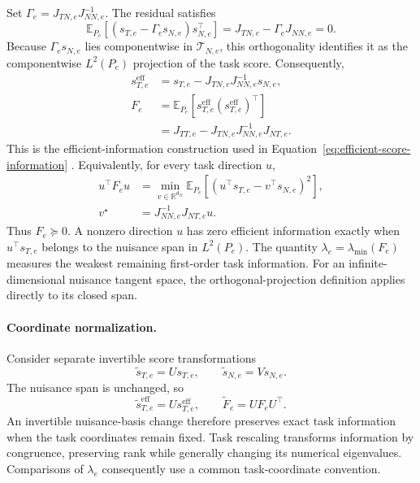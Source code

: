 Set \(\Gamma_e=J_{TN,e}J_{NN,e}^{-1}\). The residual satisfies
\[
\mathbb E_{P_e}\!\left[
(s_{T,e}-\Gamma_es_{N,e})s_{N,e}^{\top}
\right]
=
J_{TN,e}-\Gamma_eJ_{NN,e}
=
0.
\tag{A.1}\label{eq:app-score-orthogonality}
\]
Because \(\Gamma_es_{N,e}\) lies componentwise in \(\mathcal T_{N,e}\), this orthogonality identifies it as the componentwise \(L^2(P_e)\) projection of the task score. Consequently,
\[
\begin{aligned}
s_{T,e}^{\mathrm{eff}}
&=
s_{T,e}-J_{TN,e}J_{NN,e}^{-1}s_{N,e},
\\
F_e
&=
\mathbb E_{P_e}\!\left[
s_{T,e}^{\mathrm{eff}}
(s_{T,e}^{\mathrm{eff}})^{\top}
\right]
\\
&=
J_{TT,e}-J_{TN,e}J_{NN,e}^{-1}J_{NT,e}.
\end{aligned}
\tag{A.2}\label{eq:app-efficient-schur}
\]
This is the efficient-information construction used in Equation~\eqref{eq:efficient-score-information} \citep{bickel1993efficient,tsiatis2006semiparametric}. Equivalently, for every task direction \(u\),
\[
\begin{aligned}
u^{\top}F_eu
&=
\min_{v\in\mathbb R^{d_N}}
\mathbb E_{P_e}\!\left[
(u^{\top}s_{T,e}-v^{\top}s_{N,e})^2
\right],
\\
v^\star
&=
J_{NN,e}^{-1}J_{NT,e}u.
\end{aligned}
\tag{A.3}\label{eq:app-variational-schur}
\]
Thus \(F_e\succeq0\). A nonzero direction \(u\) has zero efficient information exactly when \(u^{\top}s_{T,e}\) belongs to the nuisance span in \(L^2(P_e)\). The quantity \(\lambda_e=\lambda_{\min}(F_e)\) measures the weakest remaining first-order task information. For an infinite-dimensional nuisance tangent space, the orthogonal-projection definition applies directly to its closed span.

\paragraph{Coordinate normalization.}

Consider separate invertible score transformations
\[
\widetilde s_{T,e}=Us_{T,e},
\qquad
\widetilde s_{N,e}=Vs_{N,e}.
\]
The nuisance span is unchanged, so
\[
\widetilde s_{T,e}^{\mathrm{eff}}
=
Us_{T,e}^{\mathrm{eff}},
\qquad
\widetilde F_e
=
UF_eU^{\top}.
\tag{A.4}\label{eq:app-coordinate-congruence}
\]
An invertible nuisance-basis change therefore preserves exact task information when the task coordinates remain fixed. Task rescaling transforms information by congruence, preserving rank while generally changing its numerical eigenvalues. Comparisons of \(\lambda_e\) consequently use a common task-coordinate convention.

